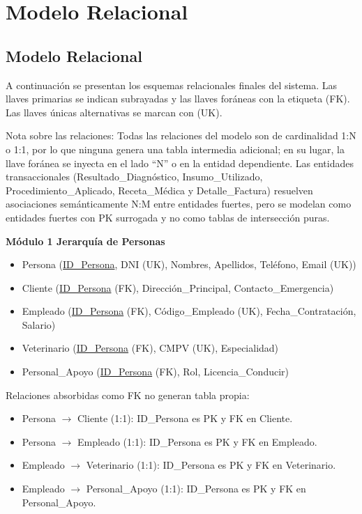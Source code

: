 \chapter{Modelo Relacional}

\section{Modelo Relacional}

A continuación se presentan los esquemas relacionales finales del sistema. Las llaves primarias se indican subrayadas y las llaves foráneas con la etiqueta (FK). Las llaves únicas alternativas se marcan con (UK).

Nota sobre las relaciones: Todas las relaciones del modelo son de cardinalidad 1:N o 1:1, por lo que ninguna genera una tabla intermedia adicional; en su lugar, la llave foránea se inyecta en el lado ``N'' o en la entidad dependiente. Las entidades transaccionales (Resultado\_Diagnóstico, Insumo\_Utilizado, Procedimiento\_Aplicado, Receta\_Médica y Detalle\_Factura) resuelven asociaciones semánticamente N:M entre entidades fuertes, pero se modelan como entidades fuertes con PK surrogada y no como tablas de intersección puras.

\vspace{0.5cm}
\noindent \textbf{Módulo 1 Jerarquía de Personas}

\begin{itemize}
	\item Persona (\underline{ID\_Persona}, DNI (UK), Nombres, Apellidos, Teléfono, Email (UK))
	\item Cliente (\underline{ID\_Persona} (FK), Dirección\_Principal, Contacto\_Emergencia)
	\item Empleado (\underline{ID\_Persona} (FK), Código\_Empleado (UK), Fecha\_Contratación, Salario)
	\item Veterinario (\underline{ID\_Persona} (FK), CMPV (UK), Especialidad)
	\item Personal\_Apoyo (\underline{ID\_Persona} (FK), Rol, Licencia\_Conducir)
\end{itemize}

Relaciones absorbidas como FK no generan tabla propia:
\begin{itemize}
	\item Persona $\rightarrow$ Cliente (1:1): ID\_Persona es PK y FK en Cliente.
	\item Persona $\rightarrow$ Empleado (1:1): ID\_Persona es PK y FK en Empleado.
	\item Empleado $\rightarrow$ Veterinario (1:1): ID\_Persona es PK y FK en Veterinario.
	\item Empleado $\rightarrow$ Personal\_Apoyo (1:1): ID\_Persona es PK y FK en Personal\_Apoyo.
\end{itemize}

